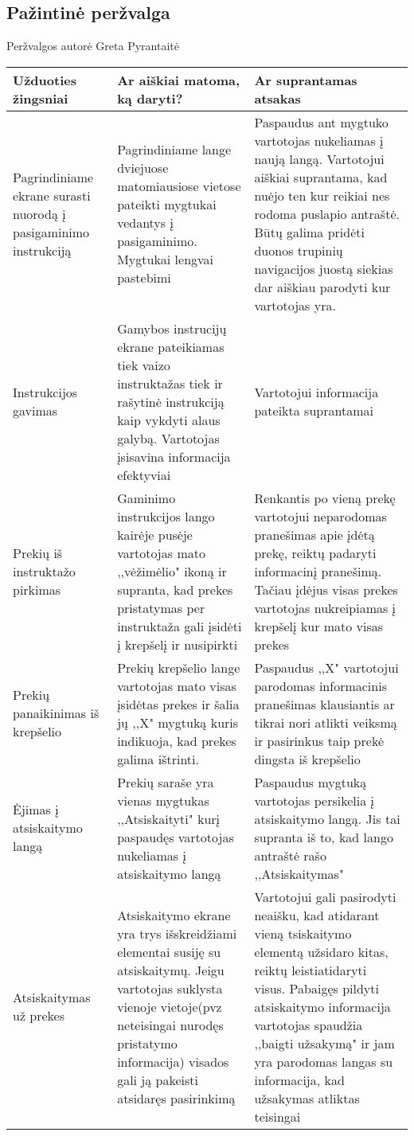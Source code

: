 \documentclass[oneside]{VUMIFPSkursinis}
\begin{document}
	\subsection{Pažintinė peržvalga}
Peržvalgos autorė Greta Pyrantaitė
\begin{center}
    \begin{tabular}{ |p{4cm}| p{6cm} | p{7cm} | }
    \hline
	Užduoties žingsniai & Ar aiškiai matoma, ką daryti? & Ar suprantamas atsakas \\ \hline
	Pagrindiniame ekrane surasti nuorodą į pasigaminimo instrukciją & Pagrindiniame lange dviejuose matomiausiose vietose pateikti mygtukai vedantys į pasigaminimo.
	Mygtukai lengvai pastebimi & Paspaudus ant mygtuko vartotojas nukeliamas į naują langą.
	Vartotojui aiškiai suprantama, kad nuėjo ten kur reikiai nes rodoma puslapio antraštė. Būtų galima pridėti duonos trupinių navigacijos juostą siekias dar aiškiau parodyti kur vartotojas yra. \\ \hline
	Instrukcijos gavimas & Gamybos instrucijų ekrane pateikiamas tiek vaizo instruktažas tiek ir rašytinė instrukciją kaip vykdyti alaus galybą. Vartotojas įsisavina informacija efektyviai & Vartotojui informacija pateikta suprantamai \\ \hline
	Prekių iš instruktažo pirkimas & Gaminimo instrukcijos lango kairėje pusėje vartotojas mato ,,vėžimėlio" ikoną ir supranta, kad prekes pristatymas per instruktaža gali įsidėti į krepšelį ir nusipirkti & Renkantis po vieną prekę vartotojui neparodomas pranešimas apie įdėtą prekę, reiktų padaryti informacinį pranešimą. Tačiau įdėjus visas prekes vartotojas nukreipiamas į krepšelį kur mato visas prekes \\ \hline
	Prekių panaikinimas iš krepšelio & Prekių krepšelio lange vartotojas mato visas įsidėtas prekes ir šalia jų ,,X" mygtuką kuris indikuoja, kad prekes galima ištrinti. & Paspaudus ,,X" vartotojui parodomas informacinis pranešimas klausiantis ar tikrai nori atlikti veiksmą ir pasirinkus taip prekė dingsta iš krepšelio \\ \hline
	Ėjimas į atsiskaitymo langą & Prekių saraše yra vienas mygtukas ,,Atsiskaityti" kurį paspaudęs vartotojas nukeliamas į atsiskaitymo langą & Paspaudus mygtuką vartotojas persikelia į atsiskaitymo langą. Jis tai supranta iš to, kad lango antraštė rašo ,,Atsiskaitymas" \\ \hline
	Atsiskaitymas už prekes & Atsiskaitymo ekrane yra trys išskreidžiami elementai susiję su atsiskaitymų. Jeigu vartotojas suklysta vienoje vietoje(pvz neteisingai nurodęs pristatymo informacija) visados gali ją pakeisti atsidaręs pasirinkimą & Vartotojui gali pasirodyti neaišku, kad atidarant vieną tsiskaitymo elementą užsidaro kitas, reiktų leistiatidaryti visus. Pabaigęs pildyti atsiskaitymo informacija vartotojas spaudžia ,,baigti užsakymą" ir jam yra parodomas langas su informacija, kad užsakymas atliktas teisingai \\ \hline

\end{tabular}
\end{center}
\end{document}
